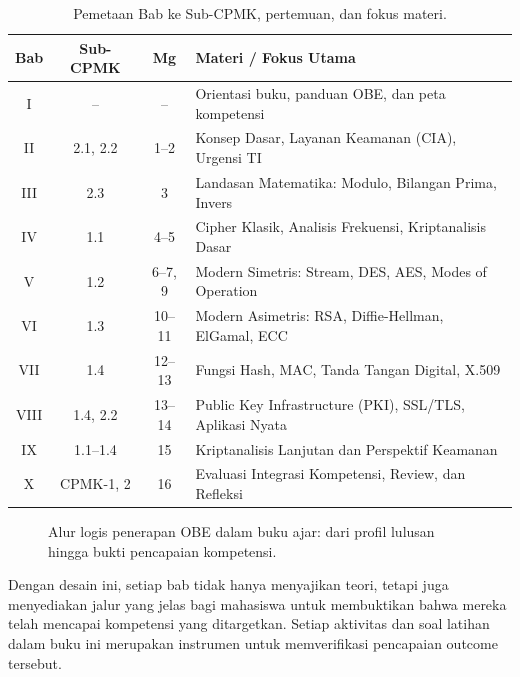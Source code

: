 \begin{table}[htbp]
\centering
\small
\begin{tabular}{|c|c|c|>{\raggedright\arraybackslash}p{5cm}|}
\hline
\textbf{Bab} & \textbf{Sub-CPMK} & \textbf{Mg} & \textbf{Materi / Fokus Utama} \\
\hline
I & -- & -- & Orientasi buku, panduan OBE, dan peta kompetensi \\
\hline
II & 2.1, 2.2 & 1--2 & Konsep Dasar, Layanan Keamanan (CIA), Urgensi TI \\
\hline
III & 2.3 & 3 & Landasan Matematika: Modulo, Bilangan Prima, Invers \\
\hline
IV & 1.1 & 4--5 & Cipher Klasik, Analisis Frekuensi, Kriptanalisis Dasar \\
\hline
V & 1.2 & 6--7, 9 & Modern Simetris: Stream, DES, AES, Modes of Operation \\
\hline
VI & 1.3 & 10--11 & Modern Asimetris: RSA, Diffie-Hellman, ElGamal, ECC \\
\hline
VII & 1.4 & 12--13 & Fungsi Hash, MAC, Tanda Tangan Digital, X.509 \\
\hline
VIII & 1.4, 2.2 & 13--14 & Public Key Infrastructure (PKI), SSL/TLS, Aplikasi Nyata \\
\hline
IX & 1.1--1.4 & 15 & Kriptanalisis Lanjutan dan Perspektif Keamanan \\
\hline
X & CPMK-1, 2 & 16 & Evaluasi Integrasi Kompetensi, Review, dan Refleksi \\
\hline
\end{tabular}
\caption{Pemetaan Bab ke Sub-CPMK, pertemuan, dan fokus materi.}
\end{table}

\begin{figure}[htbp]
  \centering
  \caption{Alur logis penerapan OBE dalam buku ajar: dari profil lulusan hingga bukti pencapaian kompetensi.}
\end{figure}

Dengan desain ini, setiap bab tidak hanya menyajikan teori, tetapi juga menyediakan jalur yang jelas bagi mahasiswa untuk membuktikan bahwa mereka telah mencapai kompetensi yang ditargetkan. Setiap aktivitas dan soal latihan dalam buku ini merupakan instrumen untuk memverifikasi pencapaian outcome tersebut.
